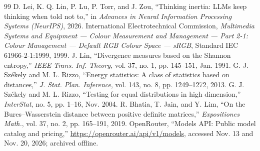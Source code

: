 \begin{thebibliography}{99}
 D. Lei, K. Q. Lin, P. Lu, P. Torr, and J. Zou, ``Thinking inertia: LLMs keep thinking when told not to,'' in \emph{Advances in Neural Information Processing Systems (NeurIPS)}, 2026.
 International Electrotechnical Commission, \emph{Multimedia Systems and Equipment --- Colour Measurement and Management --- Part 2-1: Colour Management --- Default RGB Colour Space --- sRGB}, Standard IEC 61966-2-1:1999, 1999.
 J. Lin, ``Divergence measures based on the Shannon entropy,'' \emph{IEEE Trans. Inf. Theory}, vol. 37, no. 1, pp. 145--151, Jan. 1991.
 G. J. Sz\'{e}kely and M. L. Rizzo, ``Energy statistics: A class of statistics based on distances,'' \emph{J. Stat. Plan. Inference}, vol. 143, no. 8, pp. 1249--1272, 2013.
 G. J. Sz\'{e}kely and M. L. Rizzo, ``Testing for equal distributions in high dimension,'' \emph{InterStat}, no. 5, pp. 1--16, Nov. 2004.
 R. Bhatia, T. Jain, and Y. Lim, ``On the Bures--Wasserstein distance between positive definite matrices,'' \emph{Expositiones Math.}, vol. 37, no. 2, pp. 165--191, 2019.
 OpenRouter, ``Models API: Public model catalog and pricing,'' \url{https://openrouter.ai/api/v1/models}, accessed Nov. 13 and Nov. 20, 2026; archived offline.
\end{thebibliography}
